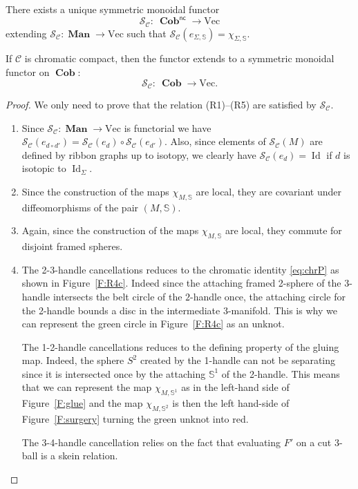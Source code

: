 \documentclass[pdftex]{sigma}
\numberwithin{equation}{section}
\numberwithin{theorem}{section}
\numberwithin{proposition}{section}
\numberwithin{definition}{section}
\numberwithin{lemma}{section}
\numberwithin{corollary}{section}
\numberwithin{remark}{section}
\numberwithin{example}{section}
\newcommand{\cat}{\mathcal{C}}
\newcommand{\Id}{\operatorname{Id}}
\newcommand{\TSkein}{{\mathscr{S}}}
\newcommand{\Vect}{\mathrm{Vec}}
\newcommand{\cob}{\operatorname{\textbf{Cob}}}
\newcommand{\nc}[1]{{#1^{\mathsf{nc}}}}
\newcommand{\man}{\operatorname{\textbf{Man}}}
\newcommand{\Sp}{\mathbb{S}}
\begin{document}
\begin{theorem}\label{T:S}
 There exists a unique symmetric monoidal functor{\samepage
 \[
 \TSkein_\cat\colon\ \nc\cob\to\Vect
 \]
 extending $\TSkein_\cat\colon \man\to\Vect$
 such that $\TSkein_\cat(e_{\Sigma,\Sp})=\chi_{\Sigma,\Sp}$.}

 If $\cat$ is chromatic compact, then the functor extends to a symmetric monoidal functor on $\cob$:
 \[
 \TSkein_\cat\colon\ \cob\to\Vect.
 \]
\end{theorem}
\begin{proof}
 We only need to prove that the relation (R1)--(R5) are satisfied by
 $\TSkein_\cat$.
 \begin{enumerate}\itemsep=0pt
 \item[(R1)] Since $\TSkein_\cat\colon \man\to\Vect$ is functorial we have
 $\TSkein_\cat(e_{d\circ d'})=\TSkein_\cat(e_{d})\circ
 \TSkein_\cat(e_{d'})$. Also, since elements of
 $\TSkein_\cat(M)$ are defined by ribbon graphs up to isotopy,
 we clearly have $\TSkein_\cat(e_{d})=\Id$ if $d$ is isotopic to
 $\Id_\Sigma$.
 \item[(R2)] Since the construction of the maps $\chi_{M,\Sp}$
 are local, they are covariant under diffeomorphisms of the pair
 $({M,\Sp})$.
 \item[(R3)] Again, since the construction of the maps
 $\chi_{M,\Sp}$ are local, they commute for disjoint framed
 spheres.
 \item[(R4)] The 2-3-handle cancellations reduces to the chromatic
 identity \eqref{eq:chrP} as shown in Figure~\ref{F:R4c}. Indeed since the attaching framed
 2-sphere of the 3-handle intersects the belt circle of the
 $2$-handle once, the attaching circle for the 2-handle bounds a
 disc in the intermediate 3-manifold. This is why we can represent
 the green circle in Figure~\ref{F:R4c} as an unknot.

 The
 1-2-handle cancellations reduces to the defining property of
 the gluing map. Indeed, the sphere $S^2$ created by the 1-handle can not
 be separating since it is intersected once by the attaching
 $\Sp^1$ of the 2-handle. This means that we can represent the map
 $\chi_{M,\Sp^1}$ as in the left-hand side of Figure~\ref{F:glue}
 and the map $\chi_{M,\Sp^2}$ is then the left hand-side of Figure~\ref{F:surgery}
 turning the green unknot into red.

 The 3-4-handle
 cancellation relies on the fact that evaluating $F'$ on a cut
 3-ball is a skein relation.


\end{enumerate}
\end{proof}
\end{document}
